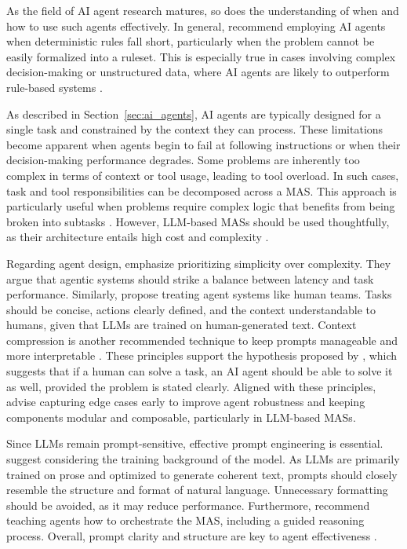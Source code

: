 \documentclass[a4paper,oneside,bibliography=totoc]{scrbook}
\begin{document}
As the field of \ac{AI} agent research matures, so does the understanding of when and how to use such agents effectively. In general, \citet{OpenAI2025} recommend employing \ac{AI} agents when deterministic rules fall short, particularly when the problem cannot be easily formalized into a ruleset. This is especially true in cases involving complex decision-making or unstructured data, where \ac{AI} agents are likely to outperform rule-based systems \cite{OpenAI2025}.

As described in Section~\ref{sec:ai_agents}, \ac{AI} agents are typically designed for a single task and constrained by the context they can process. These limitations become apparent when agents begin to fail at following instructions or when their decision-making performance degrades. Some problems are inherently too complex in terms of context or tool usage, leading to tool overload. In such cases, task and tool responsibilities can be decomposed across a \ac{MAS}. This approach is particularly useful when problems require complex logic that benefits from being broken into subtasks \cite{OpenAI2025,LangChain2025b}. However, \ac{LLM}-based \acp{MAS} should be used thoughtfully, as their architecture entails high cost and complexity \cite{Hadfield2025}.

Regarding agent design, \citet{Anthropic2024} emphasize prioritizing simplicity over complexity. They argue that agentic systems should strike a balance between latency and task performance. Similarly, \citet{Hadfield2025} propose treating agent systems like human teams. Tasks should be concise, actions clearly defined, and the context understandable to humans, given that \acp{LLM} are trained on human-generated text. Context compression is another recommended technique to keep prompts manageable and more interpretable \cite{Hadfield2025}. These principles support the hypothesis proposed by \citet{Anthropic2024}, which suggests that if a human can solve a task, an \ac{AI} agent should be able to solve it as well, provided the problem is stated clearly. Aligned with these principles, \citet{OpenAI2025} advise capturing edge cases early to improve agent robustness and keeping components modular and composable, particularly in \ac{LLM}-based \acp{MAS}.

Since \acp{LLM} remain prompt-sensitive, effective prompt engineering is essential. \citet{Anthropic2024} suggest considering the training background of the model. As \acp{LLM} are primarily trained on prose and optimized to generate coherent text, prompts should closely resemble the structure and format of natural language. Unnecessary formatting should be avoided, as it may reduce performance. Furthermore, \citet{Hadfield2025} recommend teaching agents how to orchestrate the \ac{MAS}, including a guided reasoning process. Overall, prompt clarity and structure are key to agent effectiveness \cite{OpenAI2025}.
\end{document}
